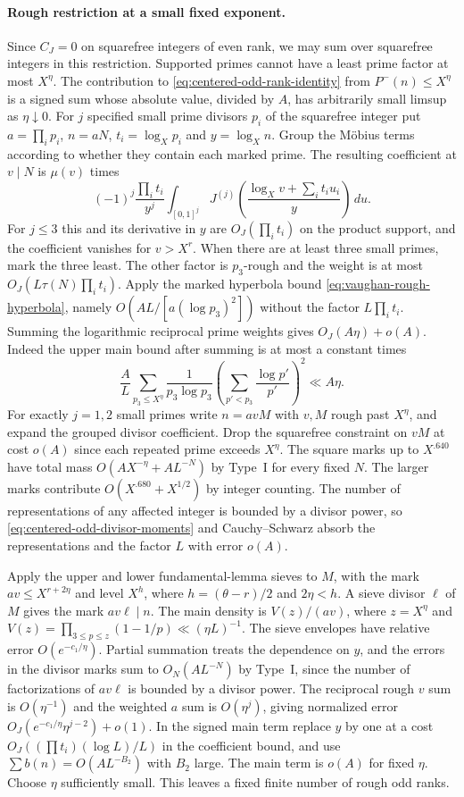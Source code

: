 \documentclass[11pt,a4paper]{article}
\theoremstyle{paperplain}
\numberwithin{equation}{section}
\begin{document}
\paragraph{Rough restriction at a small fixed exponent.}
Since $C_J=0$ on squarefree integers of even rank,
we may sum over squarefree integers in this restriction. Supported
primes cannot have a least prime factor at most $X^\eta$.
The contribution to \eqref{eq:centered-odd-rank-identity} from
$P^-(n)\le X^\eta$ is a signed sum whose absolute value, divided by
$A$, has arbitrarily small limsup as $\eta\downarrow0$. For $j$ specified
small prime divisors $p_i$ of the squarefree integer put
$a=\prod_i p_i$, $n=aN$, $t_i=\log_X p_i$ and $y=\log_X n$.
Group the M\"obius terms according to whether they contain each
marked prime. The resulting coefficient at $v\mid N$ is $\mu(v)$
times
\[
 (-1)^j\frac{\prod_i t_i}{y^j}
 \int_{[0,1]^j} J^{(j)}\!\left(
        \frac{\log_X v+\sum_i t_i u_i}{y}\right)\,du .
\]
For $j\le3$ this and its derivative in $y$ are
$O_J(\prod_i t_i)$ on the product support, and the coefficient
vanishes for $v>X^r$.
When there are at least three small primes, mark the three
least. The other factor is $p_3$-rough and the weight is
at most $O_J(L\tau(N)\prod_i t_i)$. Apply the marked hyperbola
bound \eqref{eq:vaughan-rough-hyperbola}, namely
$O(AL/[a(\log p_3)^2])$ without the factor $L\prod_i t_i$.
Summing the logarithmic reciprocal prime weights gives
$O_J(A\eta)+o(A)$. Indeed the upper main bound after summing is
at most a constant times
\[
 \frac A L\sum_{p_3\le X^\eta}\frac1{p_3\log p_3}
 \left(\sum_{p'<p_3}\frac{\log p'}{p'}\right)^2\ll A\eta.
\]
For exactly $j=1,2$ small primes write $n=avM$ with $v,M$ rough
past $X^\eta$, and expand the grouped divisor coefficient. Drop the
squarefree constraint on $vM$ at cost $o(A)$
since each repeated prime exceeds $X^\eta$. The square marks up to
$X^{.640}$ have total mass $O(AX^{-\eta}+AL^{-N})$ by Type~I for every
fixed $N$. The larger marks contribute $O(X^{.680}+X^{1/2})$ by
integer counting. The number of representations of any affected
integer is bounded by a divisor power, so
\eqref{eq:centered-odd-divisor-moments} and Cauchy--Schwarz absorb the
representations and the factor $L$ with error $o(A)$.

Apply the upper and lower fundamental-lemma sieves to $M$, with
the mark $av\le X^{r+2\eta}$ and level $X^h$, where $h=(\theta-r)/2$
and $2\eta<h$. A sieve divisor $\ell$ of $M$ gives the mark
$av\ell\mid n$. The main density is $V(z)/(av)$, where
$z=X^\eta$ and $V(z)=\prod_{3\le p\le z}(1-1/p)\ll(\eta L)^{-1}$.
The sieve envelopes have relative error $O(e^{-c_1/\eta})$.
Partial summation treats the dependence on $y$, and the errors in
the divisor marks sum to $O_N(AL^{-N})$ by Type~I, since the number
of factorizations of $av\ell$ is bounded by a divisor power.
The reciprocal rough $v$ sum
is $O(\eta^{-1})$ and the weighted $a$ sum is $O(\eta^j)$, giving
normalized error $O_J(e^{-c_1/\eta}\eta^{j-2})+o(1)$.
In the signed main term replace $y$ by one at a cost
$O_J((\prod t_i)(\log L)/L)$ in the coefficient bound, and use
$\sum b(n)=O(AL^{-B_2})$ with $B_2$ large. The main term is $o(A)$
for fixed $\eta$. Choose $\eta$ sufficiently small.
This leaves a fixed finite number of rough odd ranks.
\end{document}
